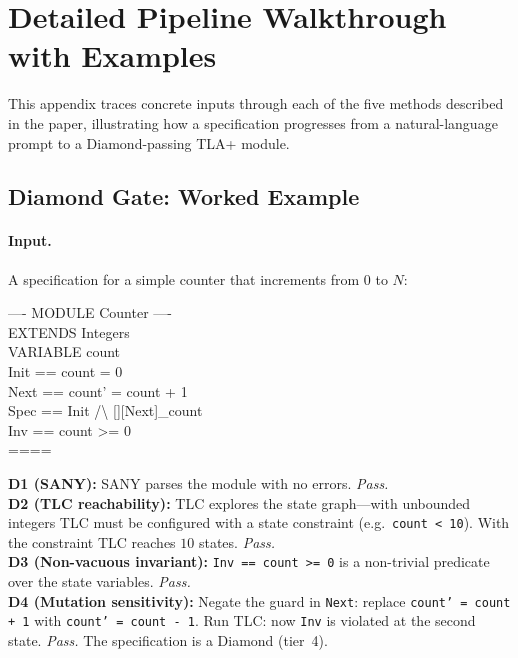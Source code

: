 \documentclass[11pt]{article}
\begin{document}
\section{Detailed Pipeline Walkthrough with Examples}
\label{sec:pipeline-walkthrough}

This appendix traces concrete inputs through each of the five methods
described in the paper, illustrating how a specification progresses from
a natural-language prompt to a Diamond-passing TLA+ module.

\subsection{Diamond Gate: Worked Example}

\paragraph{Input.} A specification for a simple counter that increments
from 0 to $N$:

\begin{tcolorbox}[enhanced, colback=cbox, colframe=cline, boxrule=0.4pt,
  arc=2pt, fontupper=\ttfamily\scriptsize]
---- MODULE Counter ----\\
EXTENDS Integers\\
VARIABLE count\\
Init == count = 0\\
Next == count' = count + 1\\
Spec == Init /\textbackslash{} [][Next]\_count\\
Inv == count >= 0\\
====
\end{tcolorbox}

\noindent\textbf{D1 (SANY):} SANY parses the module with no errors. \emph{Pass.}\\
\textbf{D2 (TLC reachability):} TLC explores the state graph---with
unbounded integers TLC must be configured with a state constraint (e.g.\
\texttt{count < 10}). With the constraint TLC reaches $10$ states.
\emph{Pass.}\\
\textbf{D3 (Non-vacuous invariant):} \texttt{Inv == count >= 0} is a
non-trivial predicate over the state variables. \emph{Pass.}\\
\textbf{D4 (Mutation sensitivity):} Negate the guard in \texttt{Next}:
replace \texttt{count' = count + 1} with \texttt{count' = count - 1}.
Run TLC: now \texttt{Inv} is violated at the second state. \emph{Pass.}
The specification is a Diamond (tier~4).
\end{document}

